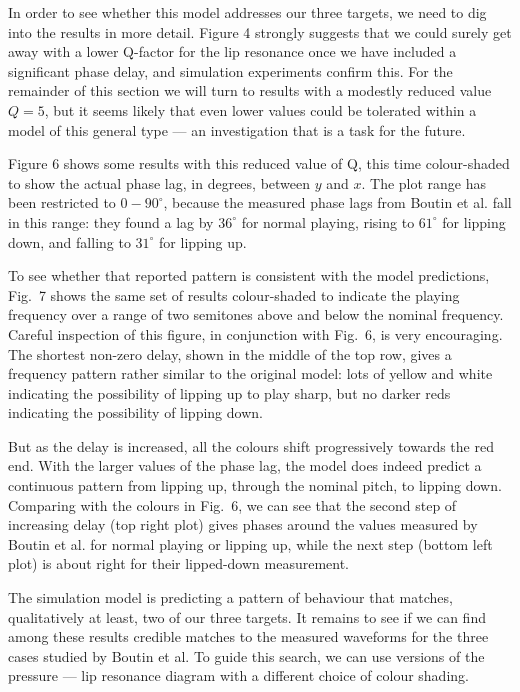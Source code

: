   In order to see whether this model addresses our three targets, we need to 
  dig into the results in more detail. Figure 4 strongly suggests that we could 
  surely get away with a lower Q-factor for the lip resonance once we have 
  included a significant phase delay, and simulation experiments confirm this. 
  For the remainder of this section we will turn to results with a modestly 
  reduced value $Q=5$, but it seems likely that even lower values could be 
  tolerated within a model of this general type --- an investigation that is a 
  task for the future. 

  Figure 6 shows some results with this reduced value of Q, this time 
  colour-shaded to show the actual phase lag, in degrees, between $y$ and $x$. 
  The plot range has been restricted to $0-90^\circ$, because the measured 
  phase lags from Boutin et al. fall in this range: they found a lag by 
  $36^\circ$ for normal playing, rising to $61^\circ$ for lipping down, and 
  falling to $31^\circ$ for lipping up. 

  To see whether that reported pattern is consistent with the model 
  predictions, Fig.\ 7 shows the same set of results colour-shaded to indicate 
  the playing frequency over a range of two semitones above and below the 
  nominal frequency. Careful inspection of this figure, in conjunction with 
  Fig.\ 6, is very encouraging. The shortest non-zero delay, shown in the 
  middle of the top row, gives a frequency pattern rather similar to the 
  original model: lots of yellow and white indicating the possibility of 
  lipping up to play sharp, but no darker reds indicating the possibility of 
  lipping down. 

  But as the delay is increased, all the colours shift progressively towards 
  the red end. With the larger values of the phase lag, the model does indeed 
  predict a continuous pattern from lipping up, through the nominal pitch, to 
  lipping down. Comparing with the colours in Fig.\ 6, we can see that the 
  second step of increasing delay (top right plot) gives phases around the 
  values measured by Boutin et al. for normal playing or lipping up, while the 
  next step (bottom left plot) is about right for their lipped-down 
  measurement. 

  The simulation model is predicting a pattern of behaviour that matches, 
  qualitatively at least, two of our three targets. It remains to see if we can 
  find among these results credible matches to the measured waveforms for the 
  three cases studied by Boutin et al. To guide this search, we can use 
  versions of the pressure --- lip resonance diagram with a different choice of 
  colour shading. 

